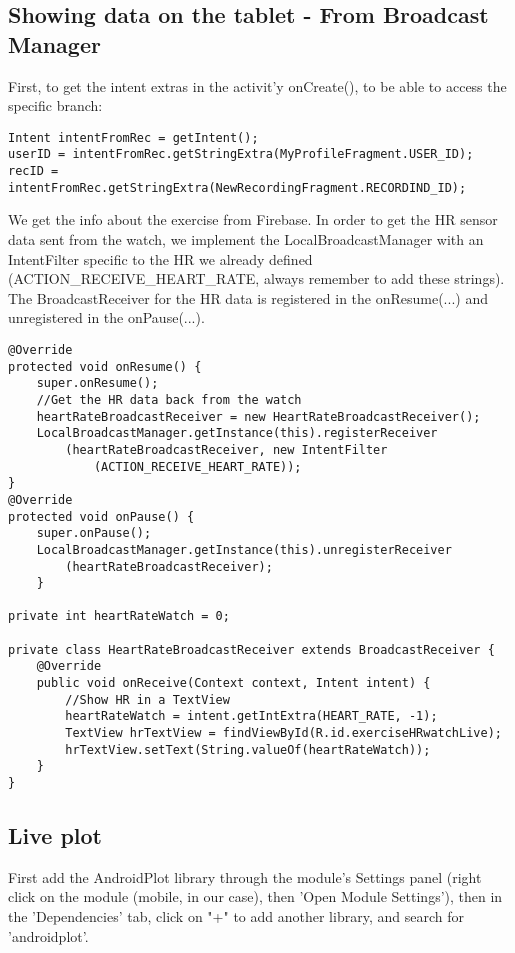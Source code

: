 \documentclass[11pt]{article}
\begin{document}
\subsection{Showing data on the tablet - From Broadcast Manager}
\label{broadcast}
First, to get the intent extras in the activit'y onCreate(), to be able to access the specific branch:
\begin{lstlisting}
Intent intentFromRec = getIntent();
userID = intentFromRec.getStringExtra(MyProfileFragment.USER_ID);
recID = intentFromRec.getStringExtra(NewRecordingFragment.RECORDIND_ID);
\end{lstlisting}
We get the info about the exercise from Firebase. %
In order to get the HR sensor data sent from the watch, we implement the LocalBroadcastManager with an IntentFilter specific to the HR we already defined (ACTION\_RECEIVE\_HEART\_RATE, always remember to add these strings). The BroadcastReceiver for the HR data is registered in the onResume(...) and unregistered in the onPause(...).
\begin{lstlisting}
@Override
protected void onResume() {
    super.onResume();
    //Get the HR data back from the watch
    heartRateBroadcastReceiver = new HeartRateBroadcastReceiver();
    LocalBroadcastManager.getInstance(this).registerReceiver
        (heartRateBroadcastReceiver, new IntentFilter
            (ACTION_RECEIVE_HEART_RATE));
}
@Override
protected void onPause() {
    super.onPause();
    LocalBroadcastManager.getInstance(this).unregisterReceiver
        (heartRateBroadcastReceiver);
    }
    
private int heartRateWatch = 0;

private class HeartRateBroadcastReceiver extends BroadcastReceiver {
    @Override
    public void onReceive(Context context, Intent intent) {
        //Show HR in a TextView
        heartRateWatch = intent.getIntExtra(HEART_RATE, -1);
        TextView hrTextView = findViewById(R.id.exerciseHRwatchLive);
        hrTextView.setText(String.valueOf(heartRateWatch));
    }
}
\end{lstlisting}

\subsection{Live plot}
First add the AndroidPlot library through the module's Settings panel (right click on the module (mobile, in our case), then 'Open Module Settings'), then in the 'Dependencies' tab, click on "+" to add another library, and search for 'androidplot'.
\end{document}
